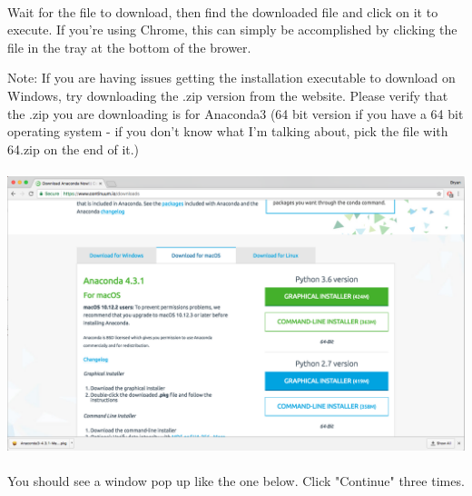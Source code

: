 \documentclass[]{article}
\begin{document}
\paragraph{}
Wait for the file to download, then find the downloaded file and click on it to execute. If you're using Chrome, this can simply be accomplished by clicking the file in the tray at the bottom of the brower.

Note: If you are having issues getting the installation executable to download on Windows, try downloading the .zip version from the website. Please verify that the .zip you are downloading is for Anaconda3 (64 bit version if you have a 64 bit operating system - if you don't know what I'm talking about, pick the file with 64.zip on the end of it.)

\paragraph{}
\begin{centering}
    \centerline{\includegraphics[scale=0.35]{Screenshot_4.png}}
\end{centering}

\paragraph{}
You should see a window pop up like the one below. Click "Continue" three times.
\end{document}
